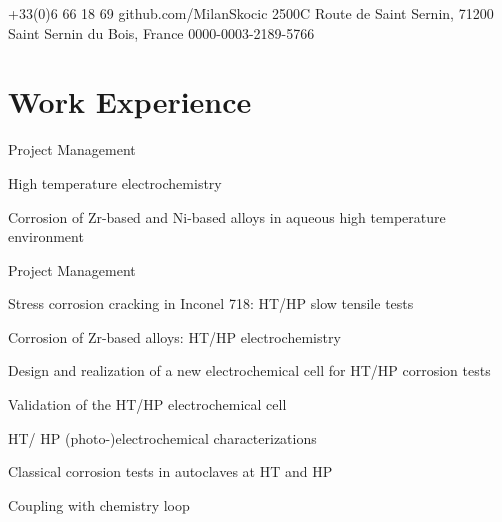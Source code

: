 \documentclass[11pt, a4paper, notitlepage]{article}
\begin{document}
\selectfont
\pagestyle{empty}
		
	
	
	{+33(0)6 66 18 69}
	{github.com/MilanSkocic}
	{2500C Route de Saint Sernin, 71200 Saint Sernin du Bois, France}
	{0000-0003-2189-5766}
	
	
	\section*{Work Experience}
		\begin{jobdetails}
			\item Project Management
			\item High temperature electrochemistry
			\item Corrosion of Zr-based and Ni-based alloys in aqueous high temperature environment
		\end{jobdetails}
		
		\begin{jobdetails}
			\item Project Management
			\item Stress corrosion cracking in Inconel 718: HT/HP slow tensile tests
			\item Corrosion of Zr-based alloys: HT/HP electrochemistry
		\end{jobdetails}

		\begin{jobdetails}
			\item Design and realization of a new electrochemical cell for HT/HP corrosion tests
			\item Validation of the HT/HP electrochemical cell
			\item HT/ HP (photo-)electrochemical characterizations
			\item Classical corrosion tests in autoclaves at HT and HP
			\item Coupling with chemistry loop
		\end{jobdetails}
\end{document}
